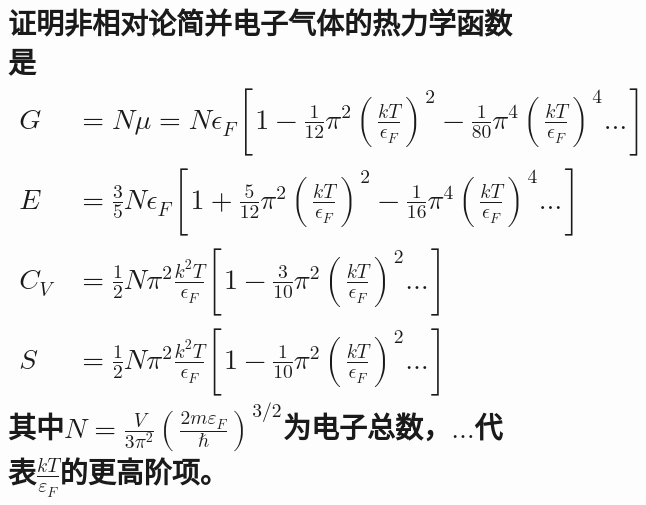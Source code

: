 \documentclass[reqno,a4paper,12pt]{amsart}
\begin{document}
\section{证明非相对论简并电子气体的热力学函数是
\begin{align*}
	G &= N\mu = N\epsilon_F\left[ 1-\frac{1}{12}\pi^2\left( \frac{kT}{\epsilon_F} \right)^2 - \frac{1}{80}\pi^4\left( \frac{kT}{\epsilon_F} \right)^4 \dots \right] \\
	E &= \frac{3}{5}N\epsilon_F \left[ 1 + \frac{5}{12}\pi^2\left( \frac{kT}{\epsilon_F} \right)^2 - \frac{1}{16}\pi^4\left( \frac{kT}{\epsilon_F} \right)^4 \dots \right] \\
	C_V &= \frac{1}{2}N\pi^2 \frac{k^2T}{\epsilon_F} \left[ 1- \frac{3}{10}\pi^2\left( \frac{kT}{\epsilon_F} \right)^2 \dots \right] \\
	S &= \frac{1}{2}N\pi^2 \frac{k^2T}{\epsilon_F} \left[ 1-\frac{1}{10} \pi^2 \left( \frac{kT}{\epsilon_F} \right)^2 \dots \right]
\end{align*}
其中$N = \frac{V}{3\pi^2} \left( \frac{2m\varepsilon_F}{\hbar} \right)^{3/2}$为电子总数，$\dots$代表$\frac{kT}{\varepsilon_F}$的更高阶项。
}
\end{document}
